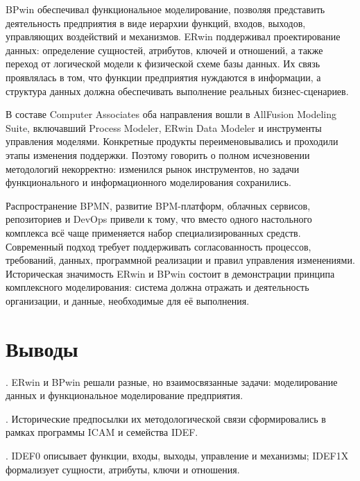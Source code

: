 \documentclass[essaypaper,paper]{pmk-graduate}
\begin{document}
BPwin обеспечивал функциональное моделирование, позволяя представить деятельность предприятия в виде иерархии функций, входов, выходов, управляющих воздействий и механизмов. ERwin поддерживал проектирование данных: определение сущностей, атрибутов, ключей и отношений, а также переход от логической модели к физической схеме базы данных. Их связь проявлялась в том, что функции предприятия нуждаются в информации, а структура данных должна обеспечивать выполнение реальных бизнес-сценариев.

\par

В составе Computer Associates оба направления вошли в AllFusion Modeling Suite, включавший Process Modeler, ERwin Data Modeler и инструменты управления моделями. Конкретные продукты переименовывались и проходили этапы изменения поддержки. Поэтому говорить о полном исчезновении методологий некорректно: изменился рынок инструментов, но задачи функционального и информационного моделирования сохранились.

\par

Распространение BPMN, развитие BPM-платформ, облачных сервисов, репозиториев и DevOps привели к тому, что вместо одного настольного комплекса всё чаще применяется набор специализированных средств. Современный подход требует поддерживать согласованность процессов, требований, данных, программной реализации и правил управления изменениями. Историческая значимость ERwin и BPwin состоит в демонстрации принципа комплексного моделирования: система должна отражать и деятельность организации, и данные, необходимые для её выполнения.

\par

\chapter*{Выводы}


. ERwin и BPwin решали разные, но взаимосвязанные задачи: моделирование данных и функциональное моделирование предприятия.\par

. Исторические предпосылки их методологической связи сформировались в рамках программы ICAM и семейства IDEF.\par

. IDEF0 описывает функции, входы, выходы, управление и механизмы; IDEF1X формализует сущности, атрибуты, ключи и отношения.\par
\end{document}
